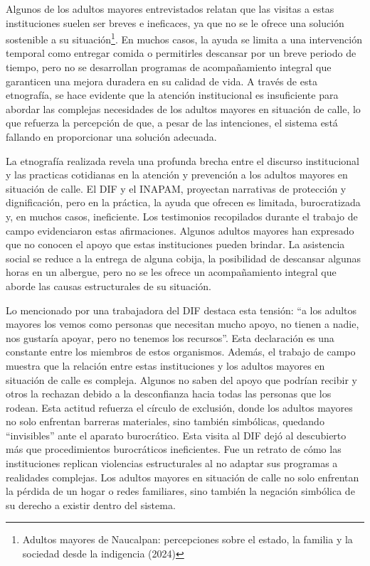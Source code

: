 \documentclass[
  spanish,
  11pt,
  a4paper,
]{scrbook}
\begin{document}
Algunos de los adultos mayores entrevistados relatan que las visitas a
estas instituciones suelen ser breves e ineficaces, ya que no se le
ofrece una solución sostenible a su situación\footnote{Adultos mayores
  de Naucalpan: percepciones sobre el estado, la familia y la sociedad
  desde la indigencia (2024)}. En muchos casos, la ayuda se limita a una
intervención temporal como entregar comida o permitirles descansar por
un breve periodo de tiempo, pero no se desarrollan programas de
acompañamiento integral que garanticen una mejora duradera en su calidad
de vida. A través de esta etnografía, se hace evidente que la atención
institucional es insuficiente para abordar las complejas necesidades de
los adultos mayores en situación de calle, lo que refuerza la percepción
de que, a pesar de las intenciones, el sistema está fallando en
proporcionar una solución adecuada.

La etnografía realizada revela una profunda brecha entre el discurso
institucional y las practicas cotidianas en la atención y prevención a
los adultos mayores en situación de calle. El DIF y el INAPAM, proyectan
narrativas de protección y dignificación, pero en la práctica, la ayuda
que ofrecen es limitada, burocratizada y, en muchos casos, ineficiente.
Los testimonios recopilados durante el trabajo de campo evidenciaron
estas afirmaciones. Algunos adultos mayores han expresado que no conocen
el apoyo que estas instituciones pueden brindar. La asistencia social se
reduce a la entrega de alguna cobija, la posibilidad de descansar
algunas horas en un albergue, pero no se les ofrece un acompañamiento
integral que aborde las causas estructurales de su situación.

Lo mencionado por una trabajadora del DIF destaca esta tensión: ``a los
adultos mayores los vemos como personas que necesitan mucho apoyo, no
tienen a nadie, nos gustaría apoyar, pero no tenemos los recursos''.
Esta declaración es una constante entre los miembros de estos
organismos. Además, el trabajo de campo muestra que la relación entre
estas instituciones y los adultos mayores en situación de calle es
compleja. Algunos no saben del apoyo que podrían recibir y otros la
rechazan debido a la desconfianza hacia todas las personas que los
rodean. Esta actitud refuerza el círculo de exclusión, donde los adultos
mayores no solo enfrentan barreras materiales, sino también simbólicas,
quedando ``invisibles'' ante el aparato burocrático. Esta visita al DIF
dejó al descubierto más que procedimientos burocráticos ineficientes.
Fue un retrato de cómo las instituciones replican violencias
estructurales al no adaptar sus programas a realidades complejas. Los
adultos mayores en situación de calle no solo enfrentan la pérdida de un
hogar o redes familiares, sino también la negación simbólica de su
derecho a existir dentro del sistema.
\end{document}
